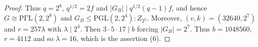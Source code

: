 \documentclass[a4paper,twopage,reqno,12pt]{amsart}
\theoremstyle{definition}
\numberwithin{equation}{section}
\newcommand{\PGL}{\mathrm{PGL}}
\newcommand{\PGaL}{\mathrm{P\Gamma L}}
\renewcommand{\leq}{\leqslant}
\begin{document}
\begin{proof}
Thus $q=2^{8}$, $q^{1/2}=2f$ and $\left\vert G_{B}\right\vert \mid q^{1/2}(q-1)f$, and hence 
$G\cong \PGaL(2,2^{8})$ and $G_{B}\leq \PGL(2,2^{4}): Z_{2^{3}}$. Moreover, $(v,k)=(32640,2^{7})$ and $r=257\lambda$ with $\lambda \mid 2^{4}$. Then $3\cdot 5 \cdot 17 \mid b$ forcing $\left\vert G_{B}\right\vert =2^{7}$. Thus $b=1048560$, $r=4112$ and so $\lambda=16$, which is the assertion (6). 


\end{proof}
\end{document}
